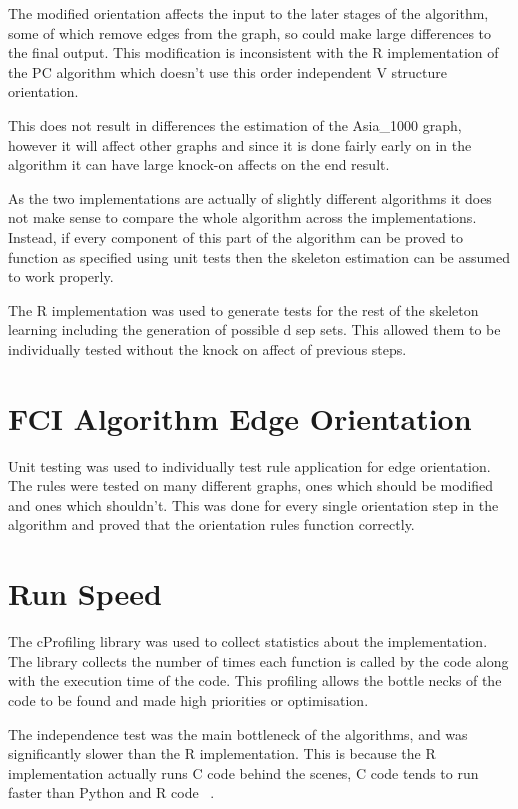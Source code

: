 \documentclass{UoYCSproject}
\begin{document}
The modified orientation affects the input to the later stages of the algorithm, some of which remove edges from the graph, so could make large differences to the final output. This modification is inconsistent with the R implementation of the PC algorithm which doesn't use this order independent V structure orientation.

This does not result in differences the estimation of the Asia\_1000 graph, however it will affect other graphs and since it is done fairly early on in the algorithm it can have large knock-on affects on the end result.

As the two implementations are actually of slightly different algorithms it does not make sense to compare the whole algorithm across the implementations. Instead, if every component of this part of the algorithm can be proved to function as specified using unit tests then the skeleton estimation can be assumed to work properly.

The R implementation was used to generate tests for the rest of the skeleton learning including the generation of possible d sep sets. This allowed them to be individually tested without the knock on affect of previous steps.

\section{FCI Algorithm Edge Orientation}

Unit testing was used to individually test rule application for edge orientation. The rules were tested on many different graphs, ones which should be modified and ones which shouldn't. This was done for every single orientation step in the algorithm and proved that the orientation rules function correctly.

 
\section{Run Speed}
The cProfiling library was used to collect statistics about the implementation. The library collects the number of times each function is called by the code along with the execution time of the code. This profiling allows the bottle necks of the code to be found and made high priorities or optimisation.

The independence test was the main bottleneck of the algorithms, and was significantly slower than the R implementation. This is because the R implementation actually runs C code behind the scenes, C code tends to run faster than Python and R code ~\parencite{wilbers2009using, wilkinson_2014}.
\end{document}
